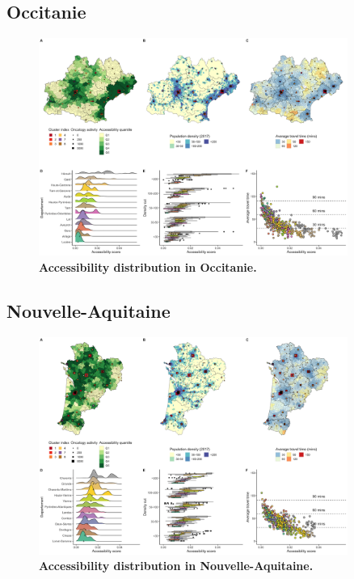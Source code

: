 \subsection*{Occitanie}

\begin{figure}[H]
    \includegraphics[width=0.9\textwidth]{images/camion/region_accessibility/accessibility_Occitanie.png}
    \centering
    \caption{
        \textbf{Accessibility distribution in Occitanie.}
    }
\end{figure}

\subsection*{Nouvelle-Aquitaine}

\begin{figure}[H]
    \includegraphics[width=0.9\textwidth]{images/camion/region_accessibility/accessibility_Nouvelle-Aquitaine.png}
    \centering
    \caption{
        \textbf{Accessibility distribution in Nouvelle-Aquitaine.}
    }
\end{figure}

